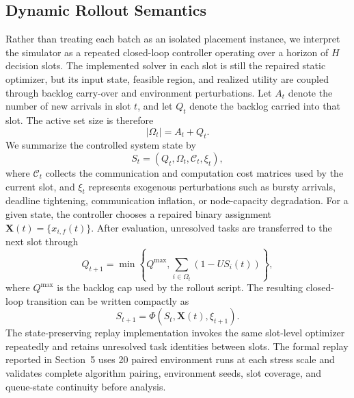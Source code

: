 \subsection{Dynamic Rollout Semantics}
\label{sec:dynamic_rollout}
Rather than treating each batch as an isolated placement instance, we interpret the simulator as a repeated closed-loop controller operating over a horizon of $H$ decision slots. The implemented solver in each slot is still the repaired static optimizer, but its input state, feasible region, and realized utility are coupled through backlog carry-over and environment perturbations. Let $A_t$ denote the number of new arrivals in slot $t$, and let $Q_t$ denote the backlog carried into that slot. The active set size is therefore
\begin{equation}
    |\Omega_t| = A_t + Q_t.
\end{equation}
We summarize the controlled system state by
\begin{equation}
    S_t = \left(Q_t,\Omega_t,\mathcal{C}_t,\xi_t\right),
\end{equation}
where $\mathcal{C}_t$ collects the communication and computation cost matrices used by the current slot, and $\xi_t$ represents exogenous perturbations such as bursty arrivals, deadline tightening, communication inflation, or node-capacity degradation. For a given state, the controller chooses a repaired binary assignment $\mathbf{X}(t)=\{x_{i,f}(t)\}$. After evaluation, unresolved tasks are transferred to the next slot through
\begin{equation}
    Q_{t+1} = \min\left\{Q^{\max}, \sum_{i \in \Omega_t} \left(1-US_i(t)\right)\right\},
\end{equation}
where $Q^{\max}$ is the backlog cap used by the rollout script. The resulting closed-loop transition can be written compactly as
\begin{equation}
    S_{t+1} = \Phi\!\left(S_t,\mathbf{X}(t),\xi_{t+1}\right).
\end{equation}
The state-preserving replay implementation invokes the same slot-level optimizer repeatedly and retains unresolved task identities between slots. The formal replay reported in Section~5 uses 20 paired environment runs at each stress scale and validates complete algorithm pairing, environment seeds, slot coverage, and queue-state continuity before analysis.

